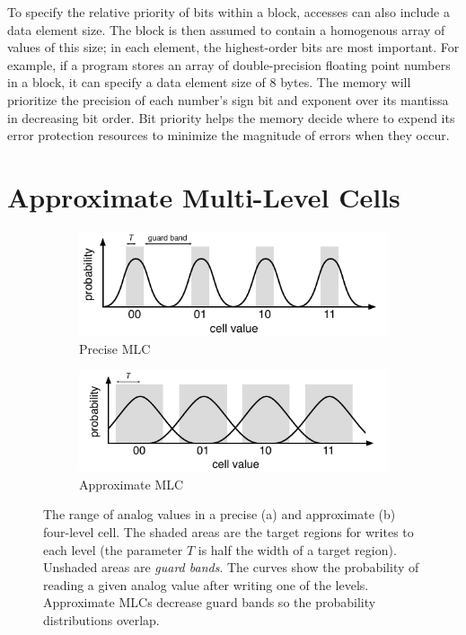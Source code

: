 To specify the relative
priority of bits within a block, accesses can also include a data
element size. The block is then assumed to contain a homogenous
array of values of this size; in each element, the highest-order bits
are most important. For example, if a program
stores an array of double-precision floating point numbers in a block,
it can specify a data element size of 8 bytes. The memory will
prioritize the precision of each number's sign bit and exponent over
its mantissa in decreasing bit order. Bit priority
helps the memory decide where to expend its error protection
resources to minimize the magnitude of errors when they occur.

\section{Approximate Multi-Level Cells}
\label{approxstorage:sec:amlc}

\begin{figure}
    \begin{subfigure}{0.5\columnwidth}
        \centering
        \includegraphics[scale=0.8]{figs/mlc-precise.pdf}
        \caption{Precise MLC}
        \label{approxstorage:fig:mlc-precise}
    \end{subfigure}
    \begin{subfigure}{0.5\columnwidth}
        \centering
        \includegraphics[scale=0.8]{figs/mlc-approx.pdf}
        \caption{Approximate MLC}
        \label{approxstorage:fig:mlc-approx}
    \end{subfigure}
    \caption{
        The range of analog values in a precise (a) and approximate (b) four-level cell. The shaded areas are
        the target regions for writes to each level (the parameter $T$ is half
        the width of a target region). Unshaded areas are
        \emph{guard bands}. The curves show the probability of reading a given
        analog value after writing one of the levels. Approximate  MLCs
        decrease guard bands so the probability distributions overlap.
    }
    \label{approxstorage:fig:mlc}
\end{figure}

